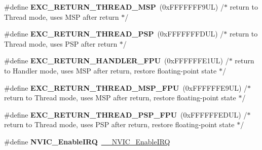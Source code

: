 \begin{DoxyCompactItemize}
\item 
\mbox{\label{group___c_m_s_i_s___core___n_v_i_c_functions_gaea4703101b5e679f695e231f7ee72331}} 
\#define {\bfseries E\+X\+C\+\_\+\+R\+E\+T\+U\+R\+N\+\_\+\+T\+H\+R\+E\+A\+D\+\_\+\+M\+SP}~(0x\+F\+F\+F\+F\+F\+F\+F9\+U\+L)     /$\ast$ return to Thread mode, uses M\+S\+P after return                                $\ast$/
\item 
\mbox{\label{group___c_m_s_i_s___core___n_v_i_c_functions_ga9998daf0fbdf31dbc8f81cd604b58175}} 
\#define {\bfseries E\+X\+C\+\_\+\+R\+E\+T\+U\+R\+N\+\_\+\+T\+H\+R\+E\+A\+D\+\_\+\+P\+SP}~(0x\+F\+F\+F\+F\+F\+F\+F\+D\+U\+L)     /$\ast$ return to Thread mode, uses P\+S\+P after return                                $\ast$/
\item 
\mbox{\label{group___c_m_s_i_s___core___n_v_i_c_functions_ga3aa6648e1c3c09fbab1f543b9dcffc3a}} 
\#define {\bfseries E\+X\+C\+\_\+\+R\+E\+T\+U\+R\+N\+\_\+\+H\+A\+N\+D\+L\+E\+R\+\_\+\+F\+PU}~(0x\+F\+F\+F\+F\+F\+F\+E1\+U\+L)     /$\ast$ return to Handler mode, uses M\+S\+P after return, restore floating-\/point state $\ast$/
\item 
\mbox{\label{group___c_m_s_i_s___core___n_v_i_c_functions_gaad4cb3b34fd4264ccfae1fbbc75a3431}} 
\#define {\bfseries E\+X\+C\+\_\+\+R\+E\+T\+U\+R\+N\+\_\+\+T\+H\+R\+E\+A\+D\+\_\+\+M\+S\+P\+\_\+\+F\+PU}~(0x\+F\+F\+F\+F\+F\+F\+E9\+U\+L)     /$\ast$ return to Thread mode, uses M\+S\+P after return, restore floating-\/point state  $\ast$/
\item 
\mbox{\label{group___c_m_s_i_s___core___n_v_i_c_functions_gadd2299e1d3a79c90b610c6b6f4cadb95}} 
\#define {\bfseries E\+X\+C\+\_\+\+R\+E\+T\+U\+R\+N\+\_\+\+T\+H\+R\+E\+A\+D\+\_\+\+P\+S\+P\+\_\+\+F\+PU}~(0x\+F\+F\+F\+F\+F\+F\+E\+D\+U\+L)     /$\ast$ return to Thread mode, uses P\+S\+P after return, restore floating-\/point state  $\ast$/
\item 
\mbox{\label{group___c_m_s_i_s___core___n_v_i_c_functions_ga57b3064413dbc7459d9646020fdd8bef}} 
\#define {\bfseries N\+V\+I\+C\+\_\+\+Enable\+I\+RQ}~\hyperlink{group___c_m_s_i_s___core___n_v_i_c_functions_ga71227e1376cde11eda03fcb62f1b33ea}{\+\_\+\+\_\+\+N\+V\+I\+C\+\_\+\+Enable\+I\+RQ}

\end{DoxyCompactItemize}
